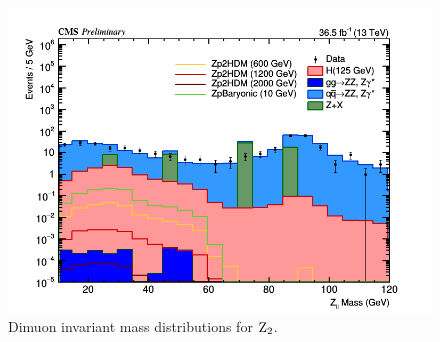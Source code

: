 \begin{enumerate}
\begin{figure}[tbh]
\centering
\includegraphics[width=5.5in]{figures/hist_hMZ2_8.png}
    \caption{Dimuon invariant mass distributions for ${\rm Z_2}$.}
    \label{fig:dimuonz2}
\end{figure}


\end{enumerate}
